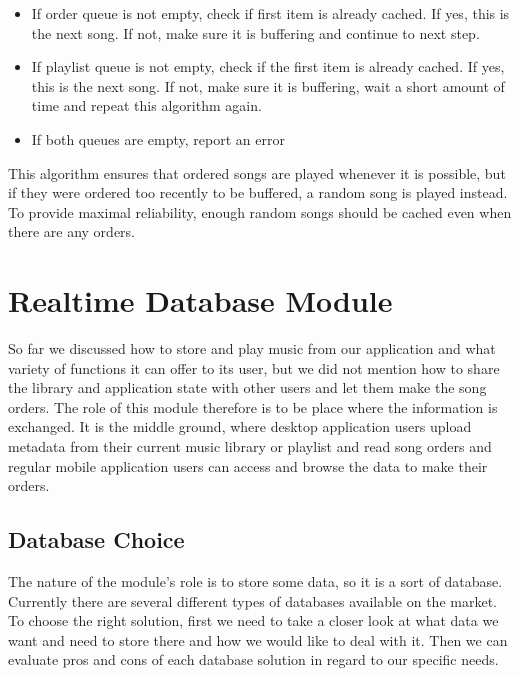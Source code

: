 \begin{itemize}
    \item If order queue is not empty, check if first item is already cached. If yes, this is the next song. If not, make sure it is buffering and continue to next step.
    \item If playlist queue is not empty, check if the first item is already cached. If yes, this is the next song. If not, make sure it is buffering, wait a short amount of time and repeat this algorithm again.
    \item If both queues are empty, report an error
\end{itemize}

This algorithm ensures that ordered songs are played whenever it is possible, but if they were ordered too recently to be buffered, a random song is played instead. To provide maximal reliability, enough random songs should be cached even when there are any orders.

\section {Realtime Database Module}

So far we discussed how to store and play music from our application and what variety of functions it can offer to its user, but we did not mention how to share the library and application state with other users and let them make the song orders. The role of this module therefore is to be place where the information is exchanged. It is the middle ground, where desktop application users upload metadata from their current music library or playlist and read song orders and regular mobile application users can access and browse the data to make their orders.

\subsection{Database Choice}

The nature of the module's role is to store some data, so it is a sort of database. Currently there are several different types of databases available on the market. To choose the right solution, first we need to take a closer look at what data we want and need to store there and how we would like to deal with it. Then we can evaluate pros and cons of each database solution in regard to our specific needs.

